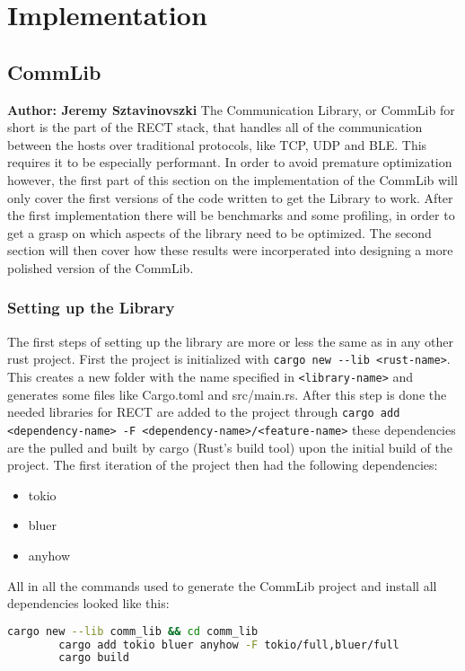 \chapter{Implementation}

\section{CommLib}
\textbf{Author: Jeremy Sztavinovszki} 
The Communication Library, or CommLib for short is the part of the RECT stack, that handles all of the communication between the hosts over traditional protocols, like TCP, UDP and BLE.
This requires it to be especially performant. In order to avoid premature optimization however, the first part of this section on the implementation of the CommLib will only cover the first versions
of the code written to get the Library to work. After the first implementation there will be benchmarks and some profiling, in order to get a grasp on which aspects of the library need to be
optimized. The second section will then cover how these results were incorperated into designing a more polished version of the CommLib.

\subsection{Setting up the Library} 
The first steps of setting up the library are more or less the same as in any other rust project. First the project is initialized with \verb+cargo new --lib <rust-name>+. This creates a
new folder with the name specified in \verb+<library-name>+ and generates some files like Cargo.toml and src/main.rs. After this step is done the needed libraries for RECT are added to the
project through \verb+cargo add <dependency-name> -F <dependency-name>/<feature-name>+ these dependencies are the pulled and built by cargo (Rust's build tool) upon the initial build of the
project. The first iteration of the project then had the following dependencies:

\begin{itemize}
	\item{tokio}
	\item{bluer}
	\item{anyhow}
\end{itemize}

All in all the commands used to generate the CommLib project and install all dependencies looked like this:
\newline
\begin{minipage}{\textwidth}
	\begin{lstlisting}[language=bash, caption=Setup Commands for CommLib]
		cargo new --lib comm_lib && cd comm_lib
		cargo add tokio bluer anyhow -F tokio/full,bluer/full
		cargo build
	\end{lstlisting}
\end{minipage}

